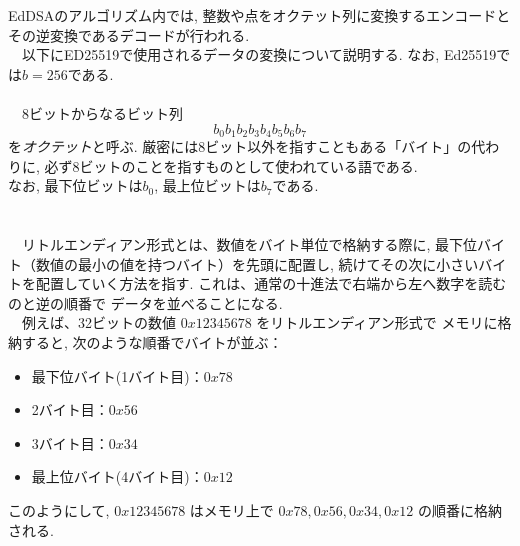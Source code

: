 EdDSAのアルゴリズム内では, 整数や点をオクテット列に変換するエンコードと
その逆変換であるデコードが行われる\cite{インフォーズ}.\\
　以下にED25519で使用されるデータの変換について説明する.
なお, Ed25519では$b=256$である.\\


\\
　8ビットからなるビット列
\[
b_0b_1b_2b_3b_4b_5b_6b_7
\]
を\emph{オクテット}と呼ぶ.
厳密には8ビット以外を指すこともある「バイト」の代わりに, 
必ず8ビットのことを指すものとして使われている語である.\\
なお, 最下位ビットは$b_0$, 最上位ビットは$b_7$である.\\[1em]
\\[1em]

\\
　リトルエンディアン形式とは、数値をバイト単位で格納する際に, 
最下位バイト（数値の最小の値を持つバイト）を先頭に配置し, 
続けてその次に小さいバイトを配置していく方法を指す.
これは、通常の十進法で右端から左へ数字を読むのと逆の順番で
データを並べることになる.\\
　例えば、32ビットの数値 $0x12345678$ をリトルエンディアン形式で
メモリに格納すると, 次のような順番でバイトが並ぶ：
\begin{itemize}
  \item 最下位バイト(1バイト目)：$0x78$
  \item 2バイト目：$0x56$
  \item 3バイト目：$0x34$
  \item 最上位バイト(4バイト目)：$0x12$
\end{itemize}
\noindent このようにして, $0x12345678$ はメモリ上で 
$0x78, 0x56, 0x34, 0x12$ の順番に格納される.\\[1em]

